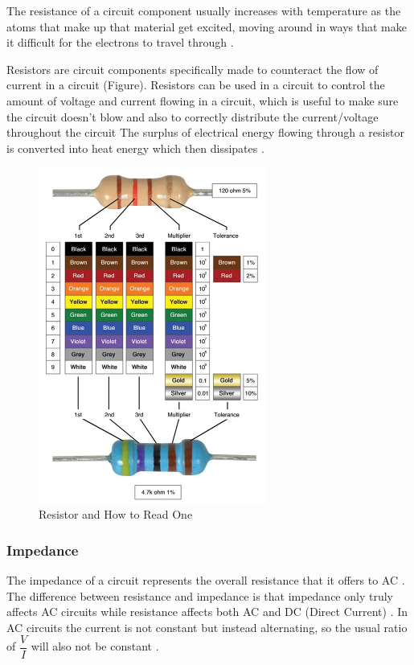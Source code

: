 \documentclass[12pt]{article}
\begin{document}
The resistance of a circuit component usually increases with temperature as the atoms that make up that material get excited, moving around in ways that make it
difficult for the electrons to travel through
\cite{britresistance,bbcresistance}.

Resistors are circuit components specifically made to counteract the flow of current in a circuit
\cite{britresistor,bbcresistance,hiokiresistance} (Figure).
Resistors can be used in a circuit to control the amount of voltage and current flowing in a circuit, which is useful to make sure the circuit doesn't blow and also
to correctly distribute the current/voltage throughout the circuit
\cite{britresistor,hiokiresistance}
The surplus of electrical energy flowing through a resistor is converted into heat energy which then dissipates
\cite{hiokiresistance}.

\begin{figure}[H]
    \centering
    \includegraphics[width=7.5cm]{resistorr.jpg}
    \caption{\centering \footnotesize{Resistor and How to Read One \protect\cite{resistorpic}}}
    \label{fig:resistor}
\end{figure}

\subsubsection{Impedance} \label{sec:1.1.2}

The impedance of a circuit represents the overall resistance that it offers to AC
\cite{lionimpedance}.
The difference between resistance and impedance is that impedance only truly affects AC circuits while resistance affects both AC and DC (Direct Current)
\cite{isaacimpedance,protimpedance}.
In AC circuits the current is not constant but instead alternating, so the usual ratio of $\dfrac{V}{I}$ will also not be constant
\cite{isaacimpedance}.
\end{document}
